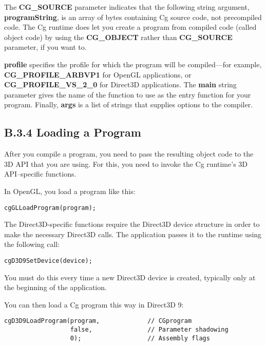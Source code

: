 \documentclass[../main.tex]{subfiles}
\begin{document}
The \textbf{CG_SOURCE} parameter indicates that the following string argument, \textbf{programString}, is an array of bytes containing Cg source code, not precompiled code. The Cg runtime does let you create a program from compiled code (called object code) by using the \textbf{CG_OBJECT} rather than \textbf{CG_SOURCE} parameter, if you want to.

\textbf{profile} specifies the profile for which the program will be compiled—for example, \textbf{CG_PROFILE_ARBVP1} for OpenGL applications, or \textbf{CG_PROFILE_VS_2_0} for Direct3D applications. The \textbf{main} string parameter gives the name of the function to use as the entry function for your program. Finally, \textbf{args} is a list of strings that supplies options to the compiler.

\subsection{B.3.4 Loading a Program}

After you compile a program, you need to pass the resulting object code to the 3D API that you are using. For this, you need to invoke the Cg runtime's 3D API–specific functions.

In OpenGL, you load a program like this:

\FloatBarrier
\begin{lstlisting}
cgGLLoadProgram(program);
\end{lstlisting}
\FloatBarrier

The Direct3D-specific functions require the Direct3D device structure in order to make the necessary Direct3D calls. The application passes it to the runtime using the following call:

\FloatBarrier
\begin{lstlisting}
cgD3D9SetDevice(device);
\end{lstlisting}
\FloatBarrier

You must do this every time a new Direct3D device is created, typically only at the beginning of the application.

You can then load a Cg program this way in Direct3D 9:

\FloatBarrier
\begin{lstlisting}
cgD3D9LoadProgram(program,             // CGprogram
                  false,               // Parameter shadowing
                  0);                  // Assembly flags
\end{lstlisting}
\FloatBarrier
\end{document}
